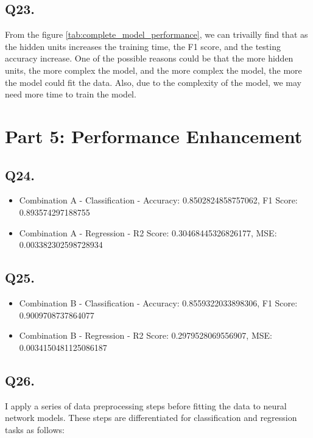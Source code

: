 \documentclass{article}
\begin{document}
\subsection*{Q23.}

From the figure \ref{tab:complete_model_performance}, we can trivailly find that as the hidden units increases the training time, the F1 score, and the testing accuracy increase.
One of the possible reasons could be that the more hidden units, the more complex the model, and the more complex the model, the more the model could fit the data.
Also, due to the complexity of the model, we may need more time to train the model.

\newpage

\section*{Part 5: Performance Enhancement}

\subsection*{Q24.}
\begin{itemize}
    \item Combination A - Classification - Accuracy: 0.8502824858757062, F1 Score: 0.893574297188755
    \item Combination A - Regression - R2 Score: 0.30468445326826177, MSE: 0.003382302598728934
\end{itemize}

\subsection*{Q25.}
\begin{itemize}
    \item Combination B - Classification - Accuracy: 0.8559322033898306, F1 Score: 0.9009708737864077
    \item Combination B - Regression - R2 Score: 0.2979528069556907, MSE: 0.0034150481125086187
\end{itemize}

\subsection*{Q26.}


I apply a series of data preprocessing steps before fitting the data to neural network models. These steps are differentiated for classification and regression tasks as follows:
\end{document}
